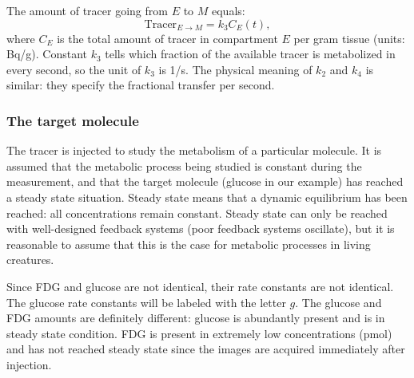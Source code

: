 \documentclass[11pt,oneside]{book}
\begin{document}
The amount of tracer going from $E$ to $M$ equals:
\begin{equation}
  \mbox{Tracer}_{E \rightarrow M} = k_3 C_E(t),
\end{equation}
where $C_E$ is the total amount of tracer in compartment $E$ per gram tissue
(units: Bq/g). Constant $k_3$ tells which fraction of the available tracer is
metabolized in every second, so the unit of $k_3$ is 1/s. The physical meaning
of $k_2$ and $k_4$ is similar: they specify the fractional transfer per
second.

\subsubsection{The target molecule}
The tracer is injected to study the metabolism of a particular molecule. It is
assumed that the metabolic process being studied is constant during the
measurement, and that the target molecule (glucose in our example) has reached
a steady state situation. Steady state means that a dynamic equilibrium has
been reached: all concentrations remain constant. Steady state can only be
reached with well-designed feedback systems (poor feedback systems oscillate),
but it is reasonable to assume that this is the case for metabolic processes
in living creatures.

Since FDG and glucose are not identical, their rate constants are not
identical.  The glucose rate constants will be labeled with the letter
$g$. The glucose and FDG amounts are definitely different: glucose is
abundantly present and is in steady state condition. FDG is present in
extremely low concentrations (pmol) and has not reached steady state since the
images are acquired immediately after injection.
\end{document}
